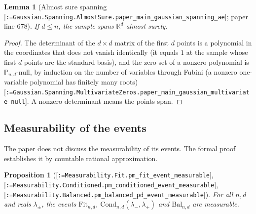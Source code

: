 \documentclass[11pt]{article}
\makeatletter
\newcommand{\formal@break}[1]{\@tfor\formal@tok:=#1\do{%
  \formal@tok
  \expandafter\ifx\formal@tok.\allowbreak\else
  \expandafter\ifx\formal@tok\_\allowbreak\fi\fi}}
\DeclareRobustCommand{\formal}[1]{\textnormal{[\texttt{\small\formal@break{#1}}]}}
\newcommand{\R}{\mathbb{R}}
\newcommand{\Prob}{\mathbb{P}}
\newcommand{\Fit}{\mathrm{Fit}}
\newcommand{\Cond}{\mathrm{Cond}}
\newcommand{\Bal}{\mathrm{Bal}}
\theoremstyle{plain}
\newtheorem{proposition}[theorem]{Proposition}
\newtheorem{lemma}[theorem]{Lemma}
\theoremstyle{definition}
\makeatother
\begin{document}
\begin{lemma}[Almost sure spanning \formal{Gaussian.Spanning.AlmostSure.paper\_main\_gaussian\_spanning\_ae}; paper line 678]\label{lem:spanning}
If $d \le n$, the sample spans $\R^d$ almost surely.
\end{lemma}

\begin{proof}
The determinant of the $d\times d$ matrix of the first $d$ points is a
polynomial in the coordinates that does not vanish identically (it equals
$1$ at the sample whose first $d$ points are the standard basis), and the
zero set of a nonzero polynomial is $\Prob_{n,d}$-null, by induction on the
number of variables through Fubini (a nonzero one-variable polynomial has
finitely many roots) \formal{Gaussian.Spanning.MultivariateZeros.paper\_main\_gaussian\_multivariate\_null}.
A nonzero determinant means the points span.
\end{proof}

\subsection{Measurability of the events}\label{sec:measurability}

The paper does not discuss the measurability of its events. The formal
proof establishes it by countable rational approximation.

\begin{proposition}[\formal{Measurability.Fit.pm\_fit\_event\_measurable}, \formal{Measurability.Conditioned.pm\_conditioned\_event\_measurable}, \formal{Measurability.Balanced.pm\_balanced\_pd\_event\_measurable}]\label{prop:measurable}
For all $n, d$ and reals $\lambda_\pm$, the events $\Fit_{n,d}$,
$\Cond_{n,d}(\lambda_-, \lambda_+)$ and $\Bal_{n,d}$ are measurable.
\end{proposition}
\end{document}
